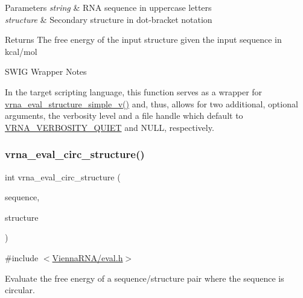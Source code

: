\begin{DoxyParams}{Parameters}
{\em string} & R\+NA sequence in uppercase letters \\
\hline
{\em structure} & Secondary structure in dot-\/bracket notation \\
\hline
\end{DoxyParams}
\begin{DoxyReturn}{Returns}
The free energy of the input structure given the input sequence in kcal/mol
\end{DoxyReturn}
\begin{DoxyRefDesc}{S\+W\+I\+G Wrapper Notes}
\item[\mbox{\hyperlink{wrappers__wrappers000035}{S\+W\+I\+G Wrapper Notes}}]In the target scripting language, this function serves as a wrapper for \mbox{\hyperlink{group__eval_gacd6278343e77d13f1d53588e50d303bc}{vrna\+\_\+eval\+\_\+structure\+\_\+simple\+\_\+v()}} and, thus, allows for two additional, optional arguments, the verbosity level and a file handle which default to \mbox{\hyperlink{eval_8h_af4afe19780b61b4962c613bde324128b}{V\+R\+N\+A\+\_\+\+V\+E\+R\+B\+O\+S\+I\+T\+Y\+\_\+\+Q\+U\+I\+ET}} and N\+U\+LL, respectively. \end{DoxyRefDesc}
\mbox{\label{group__eval_ga3e05a23ddf9b083f4e69881e440d4866}} 
\subsubsection{\texorpdfstring{vrna\+\_\+eval\+\_\+circ\+\_\+structure()}{vrna\_eval\_circ\_structure()}}
{\footnotesize\ttfamily int vrna\+\_\+eval\+\_\+circ\+\_\+structure (\begin{DoxyParamCaption}\item[{const char $\ast$}]{sequence,  }\item[{const char $\ast$}]{structure }\end{DoxyParamCaption})}



{\ttfamily \#include $<$\mbox{\hyperlink{eval_8h}{Vienna\+R\+N\+A/eval.\+h}}$>$}



Evaluate the free energy of a sequence/structure pair where the sequence is circular. 

